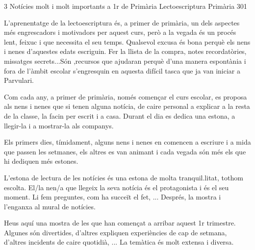 \begin{news}
{3} %
{Notícies molt i molt importants a 1r de Primària}
{Lectoescriptura}
{Primària}
{301} %


L'aprenentatge de la lectoescriptura és, a primer de primària, un dels aspectes més engrescadors i motivadors per aquest curs, però a la vegada és un procés lent, feixuc i que necessita el seu temps. Qualsevol excusa és bona perquè els nens i nenes d'aquestes edats escriguin. Fer la llista de la compra, notes recordatòries, missatges secrets...Són ,recursos que ajudaran perquè d'una manera espontània i fora de l'àmbit escolar s'engresquin en aquesta difícil tasca que ja van iniciar a Parvulari.

Com cada any, a primer de primària, només començar el curs escolar, es proposa als nens i nenes que si tenen alguna notícia, de caire personal a explicar a la resta de la classe, la facin per escrit i a casa. Durant el  dia es dedica una estona, a llegir-la i a mostrar-la als companys. 

Els primers dies, tímidament, alguns nens i nenes en comencen a escriure i a mida que passen les setmanes, els altres es van animant i cada vegada són més els que hi dediquen més estones.

L'estona de lectura de les notícies és una estona de molta tranquil.litat, tothom escolta. El/la nen/a que llegeix la seva notícia és el protagonista i és el seu moment. Li fem preguntes, com ha succeït el fet, ... Després, la mostra i l'enganxa al mural de notícies.

Heus aquí una mostra de les que han començat a arribar aquest 1r trimestre. Algunes són divertides, d'altres expliquen experiències de cap de setmana, d'altres incidents de caire quotidià, ... La temàtica és molt extensa i diversa.


\end{news}


